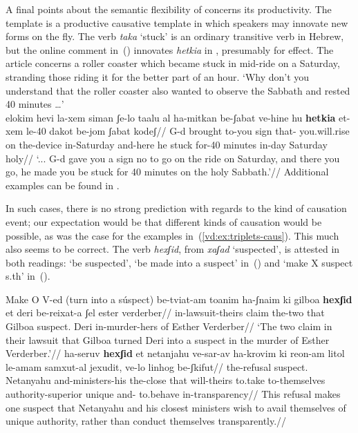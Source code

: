 A final points about the semantic flexibility of {\vd} concerns its productivity. The template {\thif} is a productive causative template \citep{lev16,kastner18tlr} in which speakers may innovate new forms on the fly. The verb \emph{taka} `stuck' is an ordinary transitive verb in Hebrew, but the online comment in~(\nextx) innovates \emph{hetkia} in {\thif}, presumably for effect. The article concerns a roller coaster which became stuck in mid-ride on a Saturday, stranding those riding it for the better part of an hour.
\ex `Why don't you understand that the roller coaster also wanted to observe the Sabbath and rested 40 minutes {\dots}' \\
	\begingl
	 elokim hevi la-xem siman ʃe-lo taalu al ha-mitkan be-ʃabat ve-hine hu \textbf{hetkia} et-xem le-40 dakot be-jom ʃabat kodeʃ//
	\glb {} G-d brought to-you sign that- you.will.rise on the-device in-Saturday and-here he stuck  for-40 minutes in-day Saturday holy//
	\glft `{...} G-d gave you a sign no to go on the ride on Saturday, and there you go, he made you be stuck for 40 minutes on the holy Sabbath.'//
	\endgl	
\xe
Additional examples can be found in \cite{lev16}.

In such cases, there is no strong prediction with regards to the kind of causation event; our expectation would be that different kinds of causation would be possible, as was the case for the examples in~(\ref{vd:ex:triplets-caus}). This much also seems to be correct. The verb \emph{hexʃid}, from \emph{xaʃad} `suspected', is attested in both readings: `be suspected', `be made into a suspect' in~(\nextx) and `make X suspect s.th' in~(\anextx).

\pex Make O V-ed (turn into a súspect)
	\a \begingl
		\gla be-tviat-am toanim ha-ʃnaim ki gilboa \textbf{hexʃid} et deri be-re{\texttslig}ixat-a ʃel ester verderber//
		\glb in-lawsuit-theirs claim the-two that Gilboa suspect.  Deri in-murder-hers of Esther Verderber//
		\glft `The two claim in their lawsuit that Gilboa turned Deri into a suspect in the murder of Esther Verderber.'//
	\endgl
	\a \begingl
		\gla ha-seruv \textbf{hexʃid} et netanjahu ve-sar-av ha-krovim ki re{\texttslig}on-am litol le-a{\texttslig}mam samxut-al jexudit, ve-lo linhog be-ʃkifut//
		\glb the-refusal suspect.  Netanyahu and-ministers-his the-close that will-theirs to.take to-themselves authority-superior unique and- to.behave in-transparency//
		\glft This refusal makes one suspect that Netanyahu and his closest ministers wish to avail themselves of unique authority, rather than conduct themselves transparently.//
	\endgl
\xe
	
